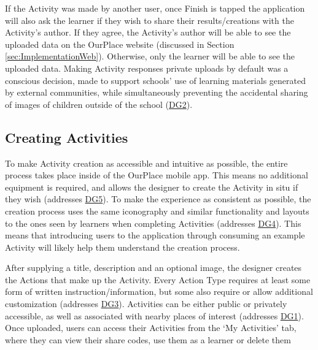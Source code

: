 If the Activity was made by another user, once Finish is tapped the application will also ask the learner if they wish to share their results/creations with the Activity's author. If they agree, the Activity's author will be able to see the uploaded data on the OurPlace website (discussed in Section \ref{sec:ImplementationWeb}). Otherwise, only the learner will be able to see the uploaded data. Making Activity responses private uploads by default was a conscious decision, made to support schools' use of learning materials generated by external communities, while simultaneously preventing the accidental sharing of images of children outside of the school (\hyperref[DG2]{DG2}). 

\subsection{Creating Activities}

To make Activity creation as accessible and intuitive as possible, the entire process takes place inside of the OurPlace mobile app. This means no additional equipment is required, and allows the designer to create the Activity in situ if they wish (addresses \hyperref[DG5]{DG5}). To make the experience as consistent as possible, the creation process uses the same iconography and similar functionality and layouts to the ones seen by learners when completing Activities (addresses \hyperref[DG4]{DG4}). This means that introducing users to the application through consuming an example Activity will likely help them understand the creation process. 



After supplying a title, description and an optional image, the designer creates the Actions that make up the Activity. Every Action Type requires at least some form of written instruction/information, but some also require or allow additional customization (addresses \hyperref[DG3]{DG3}). Activities can be either public or privately accessible, as well as associated with nearby places of interest (addresses \hyperref[DG1]{DG1}). Once uploaded, users can access their Activities from the ‘My Activities’ tab, where they can view their share codes, use them as a learner or delete them

